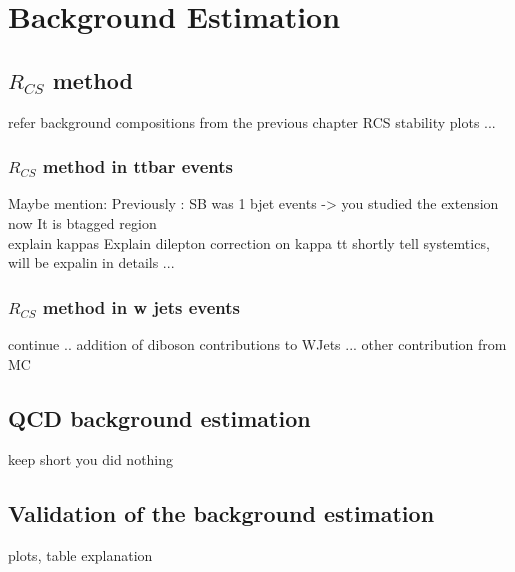 \chapter{Background Estimation}
\section{$R_{CS}$ method}
refer background compositions from the previous chapter 
\newpage
RCS stability plots ...
\newpage
\subsection{$R_{CS}$ method in ttbar events}
\newpage
Maybe mention: Previously : SB was 1 bjet events -> you studied the extension now It is btagged region \\
\newpage
explain kappas 
\newpage
Explain dilepton correction on kappa tt
\newpage
shortly tell systemtics, will be expalin in details ... 
\newpage
\subsection{$R_{CS}$ method in w jets events}
\newpage
continue ..
\newpage
addition of diboson contributions to WJets ...
\newpage
other contribution from MC
\section{QCD background estimation}
keep short you did nothing 
\newpage
\section{Validation of the background estimation}
plots, table
\newpage
explanation

